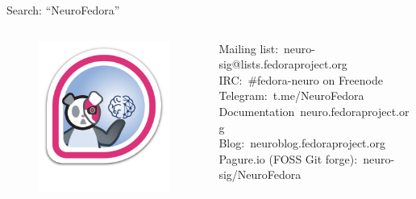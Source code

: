 \begin{frame}[c]{Search: \enquote{NeuroFedora}}
  \begin{columns}
   \begin{column}{0.3\textwidth}
      \begin{figure}[h]
        \centering
        \includegraphics[width=\linewidth]{images/NeuroFedoraBadge.png}
      \end{figure}
    \end{column}
    \begin{column}{0.8\textwidth}
      \textcolor{FedoraBlue}{Mailing list:\ neuro-sig@lists.fedoraproject.org}\\
      \textcolor{FirstGreen}{IRC:\ \#fedora-neuro on Freenode}\\
      \textcolor{FeaturesOrange}{Telegram:\ t.me/NeuroFedora}\\
      \textcolor{FriendsMagenta}{Documentation\ neuro.fedoraproject.org}\\
      \textcolor{FirstGreen}{Blog:\ neuroblog.fedoraproject.org}\\
      \textcolor{FeaturesOrange}{Pagure.io (FOSS Git forge):\ neuro-sig/NeuroFedora}
    \end{column}
  \end{columns}
\end{frame}
